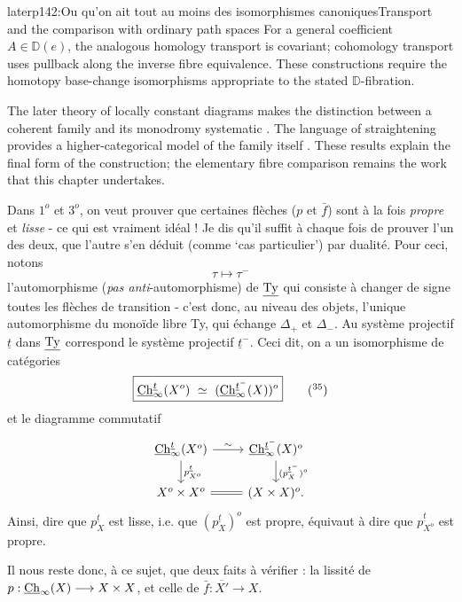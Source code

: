 \begin{dcomment}{later}{p142:Ou qu'on ait tout au moins des isomorphismes canoniques}{Transport and the comparison with ordinary path spaces}
For a general coefficient $A\in\mathbb D(e)$, the analogous homology transport is covariant; cohomology transport uses pullback along the inverse fibre equivalence. These constructions require the homotopy base-change isomorphisms appropriate to the stated $\mathbb D$-fibration.

The later theory of locally constant diagrams makes the distinction between a coherent family and its monodromy systematic \citep[Theorem~1.3 and the discussion preceding it]{Cisinski2009LocallyConstant}. The language of straightening provides a higher-categorical model of the family itself \citep[Theorem~2.2.1.2]{Lurie2009HTT}. These results explain the final form of the construction; the elementary fibre comparison remains the work that this chapter undertakes.
\end{dcomment}



Dans $1^o$ et $3^o$, on veut prouver que certaines flèches ($p$ et $\bar{f}$) sont à la fois \textit{propre} et \textit{lisse} - ce qui est vraiment idéal ! Je dis qu'il suffit à chaque fois de prouver l'un des deux, que l'autre s'en déduit (comme `cas particulier') par dualité. Pour ceci, notons
\[
\tau \longmapsto \tau^{-}
\]
l'automorphisme (\textit{pas anti}-automorphisme) de $\underline{\mathrm{Ty}}$ qui consiste à changer de signe toutes les flèches de transition - c'est donc, au niveau des objets, l'unique automorphisme du monoïde libre Ty, qui échange $\Delta_+$ et $\Delta_-$. Au système projectif $\underline{t}$ dans $\underline{\mathrm{Ty}}$ correspond le système projectif $\underline{t}^-$. Ceci dit, on a un isomorphisme de catégories
\[
\boxed{\Ch^{\underline{t}}_{\infty}(X^o) \ \simeq\ (\Ch^{\underline{t}^-}_{\infty}(X))^o} \tag*{$(^{35})$} %
\]
et le diagramme commutatif
\[
\begin{tikzcd}
\Ch^{\underline{t}}_{\infty}(X^o) \arrow[r, "\sim"] \arrow[d, "p^{\underline{t}}_{X^o}"] & \Ch^{\underline{t}^-}_{\infty}(X)^o \arrow[d, "(p^{\underline{t}^-}_{X})^o"] \\
X^o \times X^o \arrow[r, equal] & (X \times X)^o.
\end{tikzcd}
\]
Ainsi, dire que $p^{\underline{t}}_{X}$ est lisse, i.e. que $(p^{\underline{t}}_{X})^o$ est propre, équivaut à dire que $p^{\underline{t}}_{X^o}$ est propre.

Il nous reste donc, à ce sujet, que deux faits à vérifier : la lissité de $p : \underline{\mathrm{Ch}}_{\infty}(X) \longrightarrow X \times X$, et celle de $\bar{f} : \overline{X'} \longrightarrow X$.

